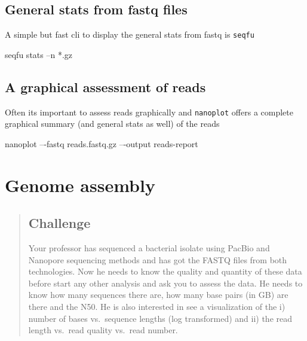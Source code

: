 \documentclass[
  letterpaper,
  DIV=11,
  numbers=noendperiod]{scrreprt}
\newenvironment{Shaded}{\begin{snugshade}}{\end{snugshade}}
\newcommand{\ExtensionTok}[1]{\textcolor[rgb]{0.00,0.46,0.62}{#1}}
\newcommand{\NormalTok}[1]{\textcolor[rgb]{0.00,0.46,0.62}{#1}}
\newcommand{\PreprocessorTok}[1]{\textcolor[rgb]{0.68,0.00,0.00}{#1}}
\begin{document}
\hypertarget{general-stats-from-fastq-files}{%
\section*{General stats from fastq
files}\label{general-stats-from-fastq-files}}

A simple but fast cli to display the general stats from fastq is
\texttt{seqfu}

\begin{Shaded}
\begin{Highlighting}[]
\ExtensionTok{seqfu}\NormalTok{ stats –n }\PreprocessorTok{*}\NormalTok{.gz}
\end{Highlighting}
\end{Shaded}

\hypertarget{a-graphical-assessment-of-reads}{%
\section*{A graphical assessment of
reads}\label{a-graphical-assessment-of-reads}}

Often its important to assess reads graphically and \texttt{nanoplot}
offers a complete graphical summary (and general stats as well) of the
reads

\begin{Shaded}
\begin{Highlighting}[]
\ExtensionTok{nanoplot}\NormalTok{ –{-}fastq reads.fastq.gz –{-}output reads{-}report}
\end{Highlighting}
\end{Shaded}

\hypertarget{genome-assembly}{%
\chapter{Genome assembly}\label{genome-assembly}}

\begin{quote}
\hypertarget{challenge-5}{%
\section{Challenge}\label{challenge-5}}

Your professor has sequenced a bacterial isolate using PacBio and
Nanopore sequencing methods and has got the FASTQ files from both
technologies. Now he needs to know the quality and quantity of these
data before start any other analysis and ask you to assess the data. He
needs to know how many sequences there are, how many base pairs (in GB)
are there and the N50. He is also interested in see a visualization of
the i) number of bases vs.~sequence lengths (log transformed) and ii)
the read length vs.~read quality vs.~read number.
\end{quote}
\end{document}
